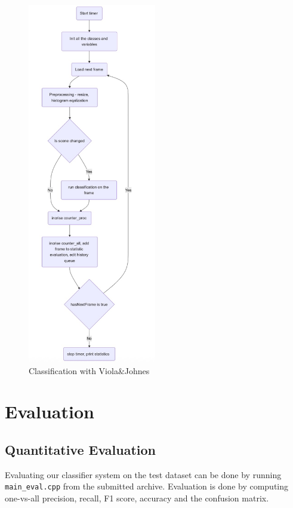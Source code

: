 \documentclass[english]{article}
\begin{document}
					\begin{figure}[H]
			\centering
			\includegraphics[width=0.5\textwidth]{figures/video_main_scheme.jpg}
			\caption{Classification with Viola\&Johnes}
			\label{fig:video_main}
		\end{figure}

	\section{Evaluation}
		\subsection{Quantitative Evaluation}
			Evaluating our classifier system on the test dataset can be done by running \texttt{main\_eval.cpp} from the submitted archive. Evaluation is done by computing one-vs-all precision, recall, F1 score, accuracy and the confusion matrix.
\end{document}
